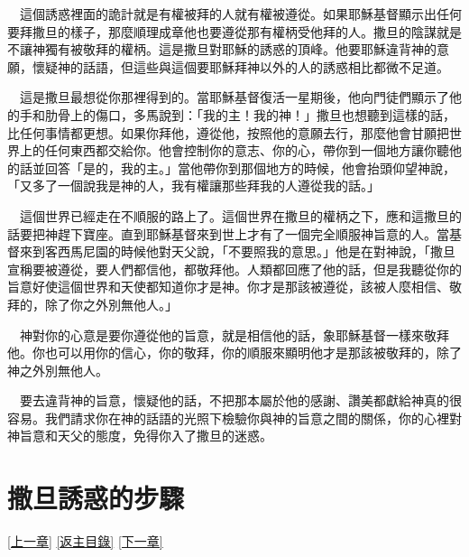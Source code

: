 \documentclass{book}
\begin{document}
　這個誘惑裡面的詭計就是有權被拜的人就有權被遵從。如果耶穌基督顯示出任何要拜撒旦的樣子，那麼順理成章他也要遵從那有權柄受他拜的人。撒旦的陰謀就是不讓神獨有被敬拜的權柄。這是撒旦對耶穌的誘惑的頂峰。他要耶穌違背神的意願，懷疑神的話語，但這些與這個要耶穌拜神以外的人的誘惑相比都微不足道。

　這是撒旦最想從你那裡得到的。當耶穌基督復活一星期後，他向門徒們顯示了他的手和肋骨上的傷口，多馬說到：「我的主！我的神！」撒旦也想聽到這樣的話，比任何事情都更想。如果你拜他，遵從他，按照他的意願去行，那麼他會甘願把世界上的任何東西都交給你。他會控制你的意志、你的心，帶你到一個地方讓你聽他的話並回答「是的，我的主。」當他帶你到那個地方的時候，他會抬頭仰望神說，「又多了一個說我是神的人，我有權讓那些拜我的人遵從我的話。」

　這個世界已經走在不順服的路上了。這個世界在撒旦的權柄之下，應和這撒旦的話要把神趕下寶座。直到耶穌基督來到世上才有了一個完全順服神旨意的人。當基督來到客西馬尼園的時候他對天父說，「不要照我的意思。」他是在對神說，「撒旦宣稱要被遵從，要人們都信他，都敬拜他。人類都回應了他的話，但是我聽從你的旨意好使這個世界和天使都知道你才是神。你才是那該被遵從，該被人麼相信、敬拜的，除了你之外別無他人。」

　神對你的心意是要你遵從他的旨意，就是相信他的話，象耶穌基督一樣來敬拜他。你也可以用你的信心，你的敬拜，你的順服來顯明他才是那該被敬拜的，除了神之外別無他人。

　要去違背神的旨意，懷疑他的話，不把那本屬於他的感謝、讚美都獻給神真的很容易。我們請求你在神的話語的光照下檢驗你與神的旨意之間的關係，你的心裡對神旨意和天父的態度，免得你入了撒旦的迷惑。

\chapter{撒旦誘惑的步驟}
\label{sec:ch14}
\hyperref[sec:ch13]{[上一章]}
\hyperlink{toc}{[返主目錄]}
\hyperref[sec:ch15]{[下一章]}

\begin{center}
\noindent{}
\end{center}
\end{document}
